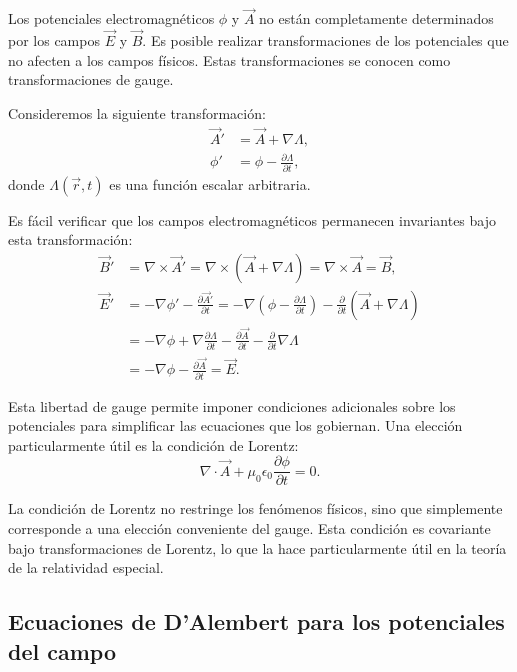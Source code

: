 \documentclass[12pt,a4paper]{book}
\begin{document}
Los potenciales electromagnéticos $\phi$ y $\vec{A}$ no están completamente determinados por los campos $\vec{E}$ y $\vec{B}$. Es posible realizar transformaciones de los potenciales que no afecten a los campos físicos. Estas transformaciones se conocen como transformaciones de gauge.

Consideremos la siguiente transformación:
\begin{align}
\vec{A}' &= \vec{A} + \nabla \Lambda, \\
\phi' &= \phi - \frac{\partial \Lambda}{\partial t},
\end{align}
donde $\Lambda(\vec{r}, t)$ es una función escalar arbitraria.

Es fácil verificar que los campos electromagnéticos permanecen invariantes bajo esta transformación:
\begin{align}
\vec{B}' &= \nabla \times \vec{A}' = \nabla \times (\vec{A} + \nabla \Lambda) = \nabla \times \vec{A} = \vec{B}, \\
\vec{E}' &= -\nabla \phi' - \frac{\partial \vec{A}'}{\partial t} = -\nabla \left(\phi - \frac{\partial \Lambda}{\partial t}\right) - \frac{\partial}{\partial t}\left(\vec{A} + \nabla \Lambda\right) \\
&= -\nabla \phi + \nabla \frac{\partial \Lambda}{\partial t} - \frac{\partial \vec{A}}{\partial t} - \frac{\partial}{\partial t}\nabla \Lambda \\
&= -\nabla \phi - \frac{\partial \vec{A}}{\partial t} = \vec{E}.
\end{align}

Esta libertad de gauge permite imponer condiciones adicionales sobre los potenciales para simplificar las ecuaciones que los gobiernan. Una elección particularmente útil es la condición de Lorentz:
\begin{equation}
\nabla \cdot \vec{A} + \mu_0 \epsilon_0 \frac{\partial \phi}{\partial t} = 0.
\end{equation}

La condición de Lorentz no restringe los fenómenos físicos, sino que simplemente corresponde a una elección conveniente del gauge. Esta condición es covariante bajo transformaciones de Lorentz, lo que la hace particularmente útil en la teoría de la relatividad especial.

\subsection{Ecuaciones de D'Alembert para los potenciales del campo}
\end{document}

